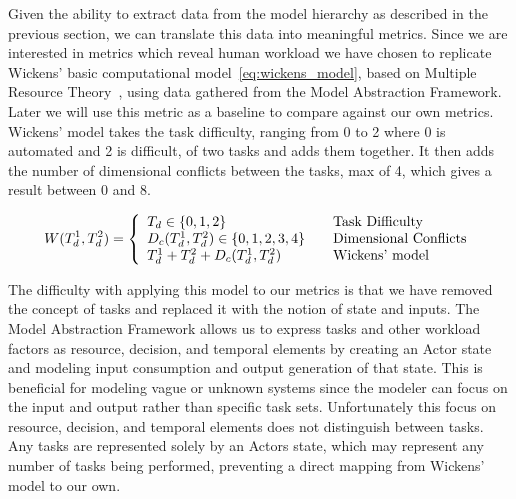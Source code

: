 Given the ability to extract data from the model hierarchy as described in the previous section, we can translate this data into meaningful metrics.  Since we are interested in metrics which reveal human workload we have chosen to replicate Wickens' basic computational model~\ref{eq:wickens_model}, based on Multiple Resource Theory~\cite{wickens2002multiple}, using data gathered from the Model Abstraction Framework.  Later we will use this metric as a baseline to compare against our own metrics.  Wickens' model takes the task difficulty, ranging from 0 to 2 where 0 is automated and 2 is difficult, of two tasks and adds them together.  It then adds the number of dimensional conflicts between the tasks, max of 4, which gives a result between 0 and 8.

\begin{equation}
W(T_{d}^{1}, T_{d}^{2}) = \left\{ 
  \begin{array}{l l}
    T_{d} \in \{0,1,2\} & \quad \text{Task Difficulty}\\
    D_{c}(T_{d}^{1}, T_{d}^{2})\in \{0,1,2,3,4\} & \quad \text{Dimensional Conflicts}\\
    T_{d}^1 + T_{d}^2 + D_{c}(T_{d}^{1}, T_{d}^{2}) & \quad \text{Wickens' model}
  \end{array}
  \right.
  \label{eq:wickens_model}
\end{equation}


The difficulty with applying this model to our metrics is that we have removed the concept of tasks and replaced it with the notion of state and inputs.  The Model Abstraction Framework allows us to express tasks and other workload factors as resource, decision, and temporal elements by creating an Actor state and modeling input consumption and output generation of that state.  This is beneficial for modeling vague or unknown systems since the modeler can focus on the input and output rather than specific task sets.  Unfortunately this focus on resource, decision, and temporal elements does not distinguish between tasks.  Any tasks are represented solely by an Actors state, which may represent any number of tasks being performed, preventing a direct mapping from Wickens' model to our own. 



